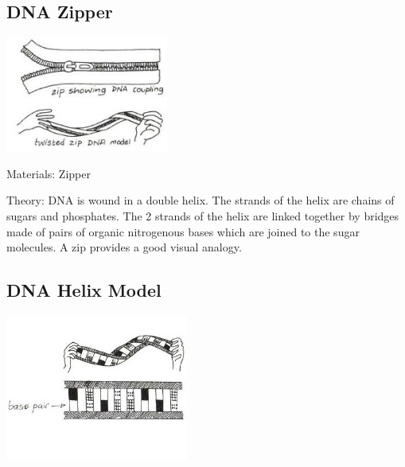 \begin{multicols}{2}
\subsection{DNA Zipper} %

\begin{center}
\includegraphics[width=0.4\textwidth]{./img/vso/dna-zipper.jpg}
\end{center}

\begin{description*}
\item[Materials:]{Zipper}
\item[Theory:]{DNA is wound in a double helix.
The strands of the helix are chains
of sugars and phosphates. The 2
strands of the helix are linked
together by bridges made of pairs
of organic nitrogenous bases
which are joined to the sugar
molecules. A zip provides a good
visual analogy.}
\end{description*}

\columnbreak

\subsection{DNA Helix Model}

\begin{center}
\includegraphics[width=0.45\textwidth]{./img/vso/dna-helix.jpg}
\end{center}


\end{multicols}
